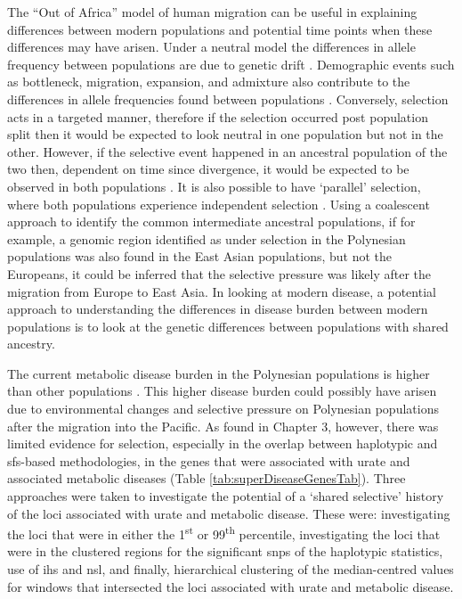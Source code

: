 \documentclass[twoside,openright]{report}
\begin{document}
The ``Out of Africa'' model of human migration can be useful in
explaining differences between modern populations and potential time
points when these differences may have arisen. Under a neutral model the
differences in allele frequency between populations are due to genetic
drift \citep{kimura1979neutral}. Demographic events such as bottleneck,
migration, expansion, and admixture also contribute to the differences
in allele frequencies found between populations \citep{Wright1951}.
Conversely, selection acts in a targeted manner, therefore if the
selection occurred post population split then it would be expected to
look neutral in one population but not in the other. However, if the
selective event happened in an ancestral population of the two then,
dependent on time since divergence, it would be expected to be observed
in both populations \citep{Hermisson2017}. It is also possible to have
`parallel' selection, where both populations experience independent
selection \citep{Tennessen2011}. Using a coalescent approach to identify
the common intermediate ancestral populations, if for example, a genomic
region identified as under selection in the Polynesian populations was
also found in the East Asian populations, but not the Europeans, it
could be inferred that the selective pressure was likely after the
migration from Europe to East Asia. In looking at modern disease, a
potential approach to understanding the differences in disease burden
between modern populations is to look at the genetic differences between
populations with shared ancestry.

The current metabolic disease burden in the Polynesian populations is
higher than other populations \citep{Winnard2012, Winnard2013}. This
higher disease burden could possibly have arisen due to environmental
changes and selective pressure on Polynesian populations after the
migration into the Pacific. As found in Chapter 3, however, there was
limited evidence for selection, especially in the overlap between
haplotypic and \gls{sfs}-based methodologies, in the genes that were
associated with urate and associated metabolic diseases (Table
\ref{tab:superDiseaseGenesTab}). Three approaches were taken to
investigate the potential of a `shared selective' history of the loci
associated with urate and metabolic disease. These were: investigating
the loci that were in either the 1\textsuperscript{st} or
99\textsuperscript{th} percentile, investigating the loci that were in
the clustered regions for the significant \glspl{snp} of the haplotypic
statistics, use of \gls{ihs} and \gls{nsl}, and finally, hierarchical
clustering of the median-centred values for windows that intersected the
loci associated with urate and metabolic disease.
\end{document}
